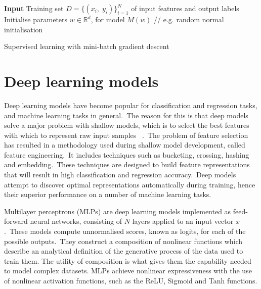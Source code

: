 \bigskip

\begin{algorithm}[H]
	\SetAlgoLined
	\textbf{Input} 
	Training set $ D = \{(x_i, \; y_i)\}_{i=1}^N $ of input features and output labels \\
	Initialise parameters $ w \in \mathbb{R}^d $, for model $ M(w) $ // e.g. random normal initialisation \\
	\caption{Supervised learning with mini-batch gradient descent}
\end{algorithm}



\section{Deep learning models}

Deep learning models have become popular for classification and regression tasks, and machine learning tasks in general.\ The reason for this is that deep models solve a major problem with shallow models, which is to select the best features with which to represent raw input samples \unskip ~\citep{Goodfellow-et-al-2016}.\ The problem of feature selection has resulted in a methodology used during shallow model development, called feature engineering.\ It includes techniques such as bucketing, crossing, hashing and embedding.\ These techniques are designed to build feature representations that will result in high classification and regression accuracy.\ Deep models attempt to discover optimal representations automatically during training, hence their superior performance on a number of machine learning tasks. \par

\noindent Multilayer perceptrons (MLPs) are deep learning models implemented as feed-forward neural networks, consisting of $N$ layers applied to an input vector $ x $.\ These models compute unnormalised scores, known as logits, for each of the possible outputs.\ They construct a composition of nonlinear functions which describe an analytical definition of the generative process of the data used to train them. The utility of composition is what gives them the capability needed to model complex datasets. MLPs achieve nonlinear expressiveness with the use of nonlinear activation functions, such as the ReLU, Sigmoid and Tanh functions.  \par

